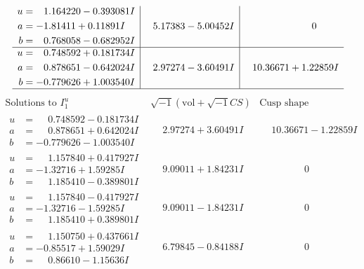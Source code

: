 \documentclass[1p]{elsarticle_modified}
\theoremstyle{definition}
\newcommand{\I}{\sqrt{-1}}
\begin{document}
$$\begin{array}{c|c|c}
\begin{aligned}
u &= \phantom{-}1.164220 - 0.393081 I \\
a &= -1.81411 + 0.11891 I \\
b &= \phantom{-}0.768058 - 0.682952 I\end{aligned}
 & \phantom{-}5.17383 - 5.00452 I & \phantom{-0.000000 } 0 \\ \hline\begin{aligned}
u &= \phantom{-}0.748592 + 0.181734 I \\
a &= \phantom{-}0.878651 - 0.642024 I \\
b &= -0.779626 + 1.003540 I\end{aligned}
 & \phantom{-}2.97274 - 3.60491 I & \phantom{-}10.36671 + 1.22859 I\\
 \hline 
 \end{array}$$\newpage$$\begin{array}{c|c|c}  
\text{Solutions to }I^u_{1}& \I (\text{vol} + \sqrt{-1}CS) & \text{Cusp shape}\\
 \hline 
\begin{aligned}
u &= \phantom{-}0.748592 - 0.181734 I \\
a &= \phantom{-}0.878651 + 0.642024 I \\
b &= -0.779626 - 1.003540 I\end{aligned}
 & \phantom{-}2.97274 + 3.60491 I & \phantom{-}10.36671 - 1.22859 I \\ \hline\begin{aligned}
u &= \phantom{-}1.157840 + 0.417927 I \\
a &= -1.32716 + 1.59285 I \\
b &= \phantom{-}1.185410 - 0.389801 I\end{aligned}
 & \phantom{-}9.09011 + 1.84231 I & \phantom{-0.000000 } 0 \\ \hline\begin{aligned}
u &= \phantom{-}1.157840 - 0.417927 I \\
a &= -1.32716 - 1.59285 I \\
b &= \phantom{-}1.185410 + 0.389801 I\end{aligned}
 & \phantom{-}9.09011 - 1.84231 I & \phantom{-0.000000 } 0 \\ \hline\begin{aligned}
u &= \phantom{-}1.150750 + 0.437661 I \\
a &= -0.85517 + 1.59029 I \\
b &= \phantom{-}0.86610 - 1.15636 I\end{aligned}
 & \phantom{-}6.79845 - 0.84188 I & \phantom{-0.000000 } 0 \\ \hline\begin{aligned}

\end{aligned}
\end{array}$$
\end{document}
